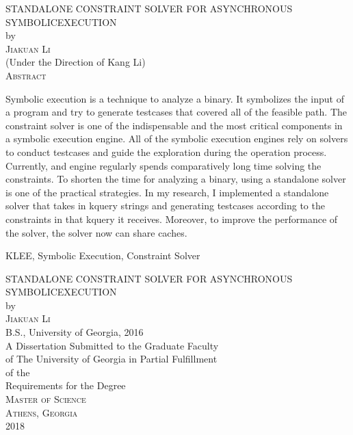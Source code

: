 \documentclass[12pt,notitlepage]{report}  %
\newcommand{\dissertationtitle}{STANDALONE CONSTRAINT SOLVER FOR ASYNCHRONOUS SYMBOLICEXECUTION}
\newcommand{\whoami}{Jiakuan Li}
\begin{document}
\newpage
\thispagestyle{empty}
\vspace*{18pt}
\begin{center}
\textsc{\large{\dissertationtitle}}\\[18pt]  %
by\\[18pt]
\textsc{\whoami}\\[12pt]
(Under the Direction of Kang Li)\\[12pt]
\textsc{Abstract}
\end{center}
Symbolic execution is a technique to analyze a binary. It symbolizes the input of a program and try to generate testcases that covered all of the feasible path. The constraint solver is one of the indispensable and the most critical components in a symbolic execution engine. All of the symbolic execution engines rely on solvers to conduct testcases and guide the exploration during the operation process. Currently, and engine regularly spends comparatively long time solving the constraints. To shorten the time for analyzing a binary, using a standalone solver is one of the practical strategies. In my research, I implemented a standalone solver that takes in kquery strings and generating testcases according to the constraints in that kquery it receives. Moreover, to improve the performance of the solver, the solver now can share caches.
\thispagestyle{empty}

\begin{list}{\textsc{Index words:\hfill}}{\leftmargin 1.4in}
\item 
\begin{flushleft}\singlespacing
KLEE,
Symbolic Execution,
Constraint Solver
\end{flushleft}
\end{list}

\newpage
{}
\thispagestyle{empty}
\vspace*{18pt}
\begin{center}
\textsc{\large{\dissertationtitle}}\\[18pt]
by\\[18pt]
\textsc{\whoami}\\[12pt]
B.S., University of Georgia, 2016\\
\vfill
A Dissertation Submitted to the Graduate Faculty \\
of The University of Georgia in Partial Fulfillment \\
of the \\
Requirements for the Degree \\[10pt]
\textsc{Master of Science}\\[36pt]
\textsc{Athens, Georgia}\\[18pt]
2018
\end{center}
\end{document}
